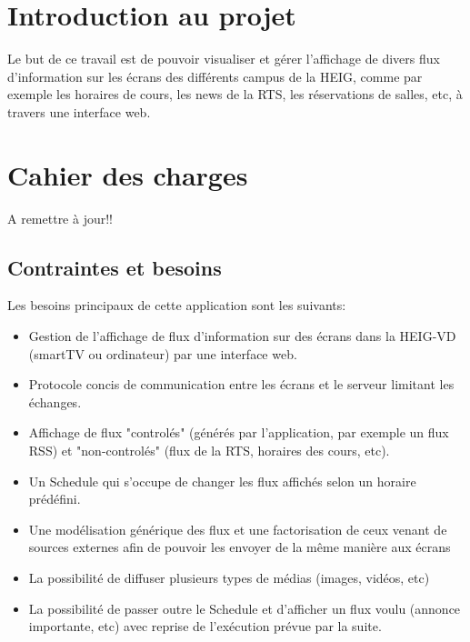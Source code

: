 \documentclass[french]{article}
\begin{document}
\maketitle

\tableofcontents
\newpage

\section{Introduction au projet}
Le but de ce travail est de pouvoir visualiser et gérer l'affichage de divers flux d'information sur les écrans des différents campus de la HEIG, comme par exemple les horaires de cours, les news de la RTS, les réservations de salles, etc, à travers une interface web.

\section{Cahier des charges}
A remettre à jour!!

\subsection{Contraintes et besoins}
Les besoins principaux de cette application sont les suivants:
\begin{itemize}
	\item Gestion de l'affichage de flux d'information sur des écrans dans la HEIG-VD (smartTV ou ordinateur) par une interface web.
	\item Protocole concis de communication entre les écrans et le serveur limitant les échanges.
	\item Affichage de flux "controlés" (générés par l'application, par exemple un flux RSS) et "non-controlés" (flux de la RTS, horaires des cours, etc).
	\item Un Schedule qui s'occupe de changer les flux affichés selon un horaire prédéfini.
	\item Une modélisation générique des flux et une factorisation de ceux venant de sources externes afin de pouvoir les envoyer de la même manière aux écrans
	\item La possibilité de diffuser plusieurs types de médias (images, vidéos, etc)
	\item La possibilité de passer outre le Schedule et d'afficher un flux voulu (annonce importante, etc) avec reprise de l'exécution prévue par la suite. \newline
\end{itemize}
\end{document}
